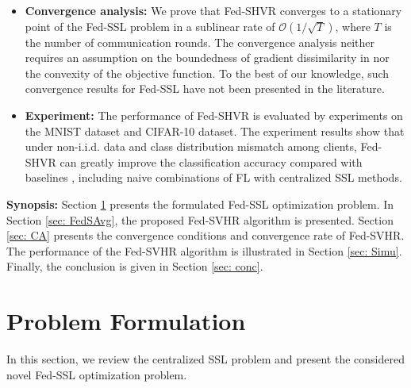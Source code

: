\documentclass[twoside,journal]{IEEEtran}
\begin{document}
\begin{itemize}
  \item {\bf Convergence analysis:}
  We prove that Fed-SHVR converges to a stationary point of the Fed-SSL problem in a sublinear rate of $\mathcal{O}(1/\sqrt{T})$, where $T$ is the number of communication rounds. The convergence analysis neither requires an assumption on the boundedness of gradient dissimilarity in \cite{wang2020tackling} nor the convexity of the objective function. To the best of our knowledge, such convergence results for Fed-SSL  have not been
presented in the literature.
  \item {\bf Experiment:} The performance of Fed-SHVR is evaluated by  experiments on the MNIST dataset and CIFAR-10 dataset.
  The experiment results show that  under non-i.i.d. data and class distribution mismatch among clients,
  Fed-SHVR can greatly improve the classification accuracy compared with baselines \cite{Jeong2021federated,zhang2020benchmarking}, including  naive combinations of FL  with centralized SSL methods.
\end{itemize}









 {\bf Synopsis:} Section \ref{sec: PF} presents the formulated Fed-SSL optimization problem. In Section \ref{sec: FedSAvg}, the proposed Fed-SVHR algorithm is presented. Section \ref{sec: CA} presents  the convergence conditions and convergence rate of  Fed-SVHR. The performance of the  Fed-SVHR algorithm is illustrated in
 Section \ref{sec: Simu}.
Finally, the conclusion is given in Section \ref{sec: conc}.

\section{Problem Formulation}\label{sec: PF}
In this section, we review the centralized SSL problem %
and present the considered novel Fed-SSL optimization problem.
\end{document}
